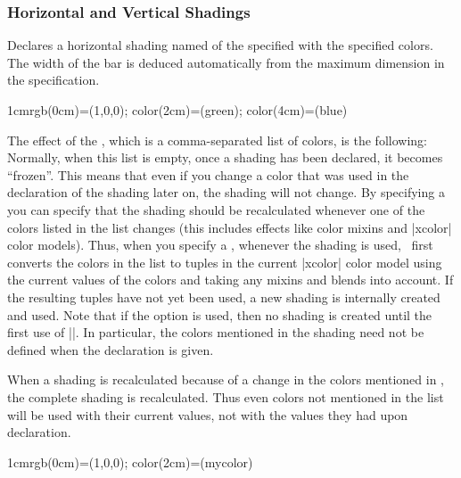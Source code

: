 \subsubsection{Horizontal and Vertical Shadings}

\begin{command}{\pgfdeclarehorizontalshading{}}
    Declares a horizontal shading named  of the specified
     with the specified colors. The width of the bar is deduced
    automatically from the maximum dimension in the specification.
\begin{codeexample}[]
  {1cm}{rgb(0cm)=(1,0,0); color(2cm)=(green); color(4cm)=(blue)}
\end{codeexample}

    The effect of the , which is a comma-separated list of
    colors, is the following: Normally, when this list is empty, once a shading
    has been declared, it becomes ``frozen''. This means that even if you
    change a color that was used in the declaration of the shading later on,
    the shading will not change. By specifying a  you can
    specify that the shading should be recalculated whenever one of the colors
    listed in the list changes (this includes effects like color mixins and
    |xcolor| color models). Thus, when you specify a ,
    whenever the shading is used, \pgfname\ first converts the colors in the
    list to tuples in the current |xcolor| color model using the current
    values of the colors and taking any mixins and blends into account. If the
    resulting tuples have not yet been used,
    a new shading is internally created and used. Note that if the option
     is used, then no shading is created until the first use
    of |\pgfuseshading|. In particular, the colors mentioned in the shading
    need not be defined when the declaration is given.

    When a shading is recalculated because of a change in the colors mentioned
    in , the complete shading is recalculated. Thus even
    colors not mentioned in the list will be used with their current values,
    not with the values they had upon declaration.
\begin{codeexample}[]
  {1cm}{rgb(0cm)=(1,0,0); color(2cm)=(mycolor)}
\end{codeexample}
\end{command}

